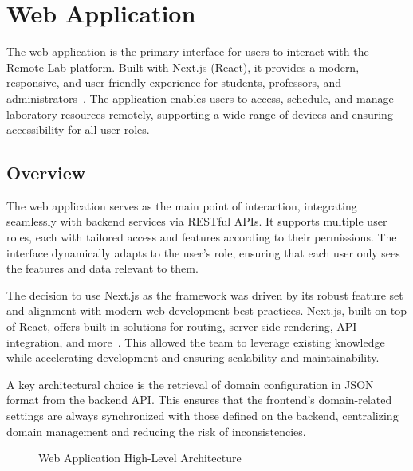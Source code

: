 \chapter{Web Application} \label{cap:web_app}

The web application is the primary interface for users to interact with the Remote Lab platform. Built with Next.js (React), it provides a modern, responsive, and user-friendly experience for students, professors, and administrators~\cite{nextjs-docs}. The application enables users to access, schedule, and manage laboratory resources remotely, supporting a wide range of devices and ensuring accessibility for all user roles.

\section{Overview}
The web application serves as the main point of interaction, integrating seamlessly with backend services via RESTful APIs. It supports multiple user roles, each with tailored access and features according to their permissions. The interface dynamically adapts to the user's role, ensuring that each user only sees the features and data relevant to them.

The decision to use Next.js as the framework was driven by its robust feature set and alignment with modern web development best practices. Next.js, built on top of React, offers built-in solutions for routing, server-side rendering, API integration, and more~\cite{nextjs-app-router,nextjs-server-client-components,nextjs-data-fetching,nextjs-api-routes}. This allowed the team to leverage existing knowledge while accelerating development and ensuring scalability and maintainability.

A key architectural choice is the retrieval of domain configuration in JSON format from the backend API. This ensures that the frontend's domain-related settings are always synchronized with those defined on the backend, centralizing domain management and reducing the risk of inconsistencies.

\begin{figure}[H]
    \begin{center}
    \end{center}
    \caption{Web Application High-Level Architecture}
    \label{fig:webapp_simple_architecture}
\end{figure}



